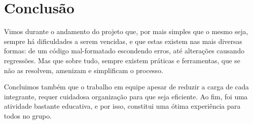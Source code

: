 \documentclass[10pt,a4paper]{report}
\begin{document}
\chapter{Conclusão}
Vimos durante o andamento do projeto que, por mais simples que o mesmo seja, sempre há dificuldades a serem vencidas, e que estas existem nas mais diversas formas: de um código mal-formatado escondendo erros, até alterações causando regressões. Mas que sobre tudo, sempre existem práticas e ferramentas, que se não as resolvem, amenizam e simplificam o processo.

Concluimos também que o trabalho em equipe apesar de reduzir a carga de cada integrante, requer cuidadosa organização para que seja eficiente. Ao fim, foi uma atividade bastante educativa, e por isso, constitui uma ótima experiência para todos no grupo.
\end{document}
